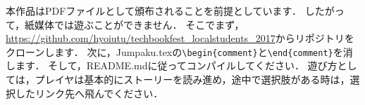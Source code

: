 本作品はPDFファイルとして頒布されることを前提としています．
したがって，紙媒体では遊ぶことができません．
そこでまず，\url{https://github.com/hyoiutu/techbookfest_localstudents_2017}からリポジトリをクローンします．
次に，Jumpaku.texの\verb`\begin{comment}`と\verb`\end{comment}`を消します．
そして，README.mdに従ってコンパイルしてください．
遊び方としては，プレイヤは基本的にストーリーを読み進め，途中で選択肢がある時は，選択したリンク先へ飛んでください．
\begin{comment}
\section{愛の仲間}\label{section:jumpakubegin}
私の名は\ruby[g]{愛}{あい}（\ref{fig:jumpakuI}）．
探偵である．
私には8人の仲間
\ruby[g]{恵伊}{えい}（\ref{fig:jumpakuA}），
\ruby[g]{美衣}{びい}（\ref{fig:jumpakuB}），
\ruby[g]{史衣}{しい}（\ref{fig:jumpakuC}），
\ruby[g]{出井}{でい}（\ref{fig:jumpakuD}），
\ruby[g]{良威}{いい}（\ref{fig:jumpakuE}），
\ruby[g]{恵夫}{えふ}（\ref{fig:jumpakuF}），
\ruby[g]{寺井}{じい}（\ref{fig:jumpakuG}），
\ruby[g]{永一}{えいいち}（\ref{fig:jumpakuH}）がいた．
\begin{figure}[b]\centering
\begin{tabular}{cccc}
\begin{minipage}{0.2\textwidth}\texttt{[image: \\jumpakuasset/A.png]}\caption{恵伊}\label{fig:jumpakuA}\end{minipage}
\begin{minipage}{0.2\textwidth}\texttt{[image: \\jumpakuasset/B.png]}\caption{美衣}\label{fig:jumpakuB}\end{minipage}
\begin{minipage}{0.2\textwidth}\texttt{[image: \\jumpakuasset/C.png]}\caption{史衣}\label{fig:jumpakuC}\end{minipage}
\begin{minipage}{0.2\textwidth}\texttt{[image: \\jumpakuasset/D.png]}\caption{出井}\label{fig:jumpakuD}\end{minipage}\\
\begin{minipage}{0.2\textwidth}\texttt{[image: \\jumpakuasset/E.png]}\caption{良威}\label{fig:jumpakuE}\end{minipage}
\begin{minipage}{0.2\textwidth}\texttt{[image: \\jumpakuasset/F.png]}\caption{恵夫}\label{fig:jumpakuF}\end{minipage}

\end{comment}
